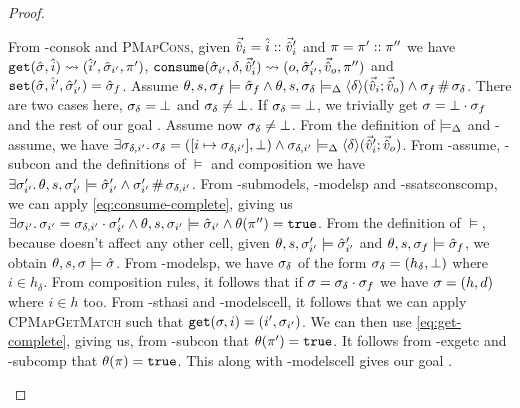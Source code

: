 \begin{proof}
\begin{hypvlist}
 From \hyp{consok} and \textsc{PMapCons}, given $\vec{\hat{v}}_i=\hat{i}::\vec{\hat{v}}_i'$ and $\pi=\pi'::\pi''$ we have $\texttt{get}(\hat{\sigma},\hat{i})\rightsquigarrow(\hat{i}', \hat{\sigma}_{i'}, \pi')$, ${\texttt{consume}(\hat{\sigma}_{i'},\delta,\vec{\hat{v}}_i')\rightsquigarrow (o,\hat{\sigma}_{i'}',\vec{\hat{v}}_o,\pi'')}$ and $\texttt{set}(\hat{\sigma},\hat{i}',\hat{\sigma}_{i'}')=\hat{\sigma}_f$.
 Assume $\theta,s,\sigma_f\models \hat{\sigma}_f \land \theta, s, \sigma_\delta \models_{\Delta} \left<\delta\right>\!(\vec{\hat{v}}_i;\vec{\hat{v}}_o) \land \sigma_f\operatorname{\#}\sigma_\delta$.
 There are two cases here, $\sigma_\delta=\bot$ and $\sigma_\delta\neq\bot$. If $\sigma_\delta=\bot$, we trivially get $\sigma=\bot\cdot\sigma_f$ and the rest of our goal .
 Assume now $\sigma_\delta\neq\bot$. From the definition of $\models_{\Delta}$ and \hyp{assume}, we have $\exists \sigma_{\delta,i'}\ldotp {\sigma_\delta=([i\mapsto\sigma_{\delta,i'}],\bot)} \land \sigma_{\delta,i'}\models_{\Delta} \left<\delta\right>\!(\vec{\hat{v}}_i';\vec{\hat{v}}_o)$.
 From \hyp{assume}, \hyp{subcon} and the definitions of $\models$  and composition we have $\exists \sigma_{i'}'\ldotp {\theta,s,\sigma_{i'}'\models\hat{\sigma}_{i'}'} \land \sigma_{i'}' \operatorname{\#} \sigma_{\delta,i'}$.
 From \hyp{submodels}, \hyp{modelsp} and \hyp{ssatsconscomp}, we can apply \ref{eq:consume-complete}, giving us $\exists \sigma_{i'}\ldotp {\sigma_{i'}=\sigma_{\delta,i'}\cdot\sigma_{i'}'} \land \theta,s,\sigma_{i'}\models \hat{\sigma}_{i'} \land \theta(\pi'')=\texttt{true}$.
 From the definition of $\models$, because \consume{} doesn't affect any other cell, given $\theta,s,\sigma'_{i'}\models\hat{\sigma}'_{i'}$ and $\theta,s,\sigma_f\models\hat{\sigma}_f$, we obtain $\theta,s,\sigma\models\hat{\sigma}$.
 From \hyp{modelsp}, we have $\sigma_\delta$ of the form $\sigma_\delta=(h_\delta,\bot)$ where $i\in h_\delta$. From composition rules, it follows that if $\sigma=\sigma_\delta\cdot\sigma_f$ we have $\sigma=(h,d)$ where $i\in h$ too.
 From \hyp{sthasi} and \hyp{modelscell}, it follows that we can apply \textsc{CPMapGetMatch} such that ${\texttt{get}(\sigma,i)=(i',\sigma_{i'})}$. We can then use \ref{eq:get-complete}, giving us, from \hyp{subcon} that $\theta(\pi')=\texttt{true}$.
 It follows from \hyp{exgetc} and \hyp{subcomp} that $\theta(\pi)=\texttt{true}$. This along with \hyp{modelscell} gives our goal .
\end{hypvlist}

\pfcase{$\delta = \domainset$}


\end{proof}
